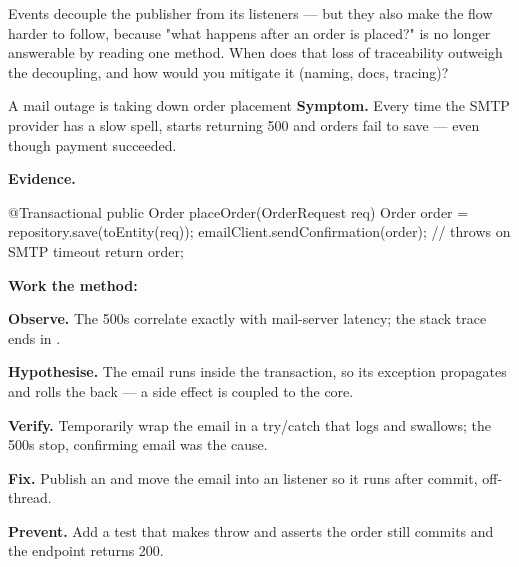 \begin{thinkbox}
Events decouple the publisher from its listeners --- but they also make the flow harder to follow, because "what happens after an order is placed?" is no longer answerable by reading one method. When does that loss of traceability outweigh the decoupling, and how would you mitigate it (naming, docs, tracing)?
\end{thinkbox}


\begin{debuglab}{A mail outage is taking down order placement}
\textbf{Symptom.} Every time the SMTP provider has a slow spell,  starts returning 500 and orders fail to save --- even though payment succeeded.

\smallskip\textbf{Evidence.}
\begin{javabox}
@Transactional
public Order placeOrder(OrderRequest req) {
  Order order = repository.save(toEntity(req));
  emailClient.sendConfirmation(order);  // throws on SMTP timeout
  return order;
}
\end{javabox}

\textbf{Work the method:}
\begin{tickcheck}
  \item \textbf{Observe.} The 500s correlate exactly with mail-server latency; the stack trace ends in .
  \item \textbf{Hypothesise.} The email runs inside the transaction, so its exception propagates and rolls the  back --- a side effect is coupled to the core.
  \item \textbf{Verify.} Temporarily wrap the email in a try/catch that logs and swallows; the 500s stop, confirming email was the cause.
  \item \textbf{Fix.} Publish an  and move the email into an  listener so it runs after commit, off-thread.
  \item \textbf{Prevent.} Add a test that makes  throw and asserts the order still commits and the endpoint returns 200.
\end{tickcheck}
\end{debuglab}

